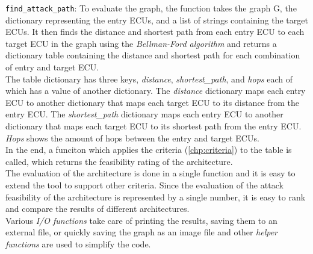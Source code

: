 \texttt{find\_attack\_path}: To evaluate the graph, the function takes the graph G,
the dictionary representing the entry ECUs, and a list of strings containing the target ECUs. 
It then finds the distance and shortest path from each entry ECU to each target ECU in the graph using the 
\textit{Bellman-Ford algorithm} and returns a dictionary table containing the distance and shortest path for each combination of entry and target ECU.\\
The table dictionary has three keys, \textit{distance}, \textit{shortest\_path}, and \textit{hops} each of which has a value of another dictionary. 
The \textit{distance} dictionary maps each entry ECU to another dictionary that maps each target ECU to its distance from the entry ECU. 
The \textit{shortest\_path} dictionary maps each entry ECU to another dictionary that maps each target ECU to its shortest path from the entry ECU.
\textit{Hops} shows the amount of hops between the entry and target ECUs.\\

In the end, a funciton which applies the criteria (\ref{chp:criteria}) to the table is called, which returns the feasibility rating of the architecture.\\
The evaluation of the architecture is done in a single function and it is easy to extend the tool to support other criteria.
Since the evaluation of the attack feasibility of the architecture is represented by a single number, 
it is easy to rank and compare the results of different architectures.\\

Various \textit{I/O functions} take care of printing the results, saving them to an external file, or quickly saving the graph as an image file
and other \textit{helper functions} are used to simplify the code.